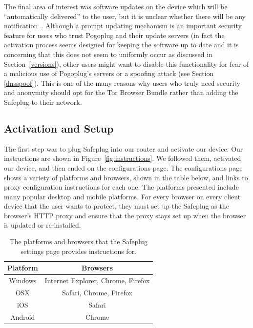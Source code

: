 \documentclass[conference]{IEEEtran}
\begin{document}
The final area of interest was software updates on the device which will be ``automatically delivered'' to the user, but it is unclear whether there will be any notification~\cite{safeplug}.  Although a prompt updating mechanism is an important security feature for users who trust Pogoplug and their update servers (in fact the activation process seems designed for keeping the software up to date and it is concerning that this does not seem to uniformly occur as discussed in Section~\ref{versions}), other users might want to disable this functionality for fear of a malicious use of Pogoplug's servers or a spoofing attack (see Section \ref{dnsspoof}).  This is one of the many reasons why users who truly need security and anonymity should opt for the Tor Browser Bundle rather than adding the Safeplug to their network.

\subsection{Activation and Setup}
The first step was to plug Safeplug into our router and activate our device.  Our instructions are shown in Figure~\ref{fig:instructions}.  We followed them, activated our device, and then ended on the configurations page.  The configurations page shows a variety of platforms and browsers, shown in the table below, and links to proxy configuration instructions for each one.  The platforms presented include many popular desktop and mobile platforms.  For every browser on every client device that the user wants to protect, they must set up the Safeplug as the browser's HTTP proxy and ensure that the proxy stays set up when the browser is updated or re-installed.


\begin{table}[!t]
\renewcommand{\arraystretch}{1.3}
\caption{The platforms and browsers that the Safeplug settings page provides instructions for.}
\label{table_example}
\centering
	\begin{tabular}{|c|c|}
	\hline
		Platform & Browsers \\ \hline
		Windows	& Internet Explorer, Chrome, Firefox \\ \hline
		OSX & Safari, Chrome, Firefox \\ \hline
		iOS	& Safari \\ \hline
		Android	& Chrome \\ \hline
	\end{tabular}
\end{table}
\end{document}
